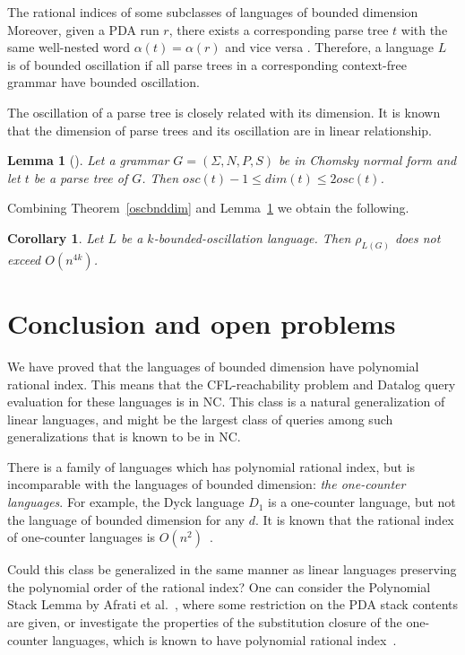 \documentclass[11pt,a4paper]{article} %
\newtheorem{lemma}{Lemma}
\newtheorem{corollary}{Corollary}
\begin{document}
\begin{subsection}{The rational indices of some subclasses of languages of bounded dimension}
Moreover, given a PDA run $r$, there exists a corresponding parse tree $t$ with the same well-nested word $\alpha(t)=\alpha(r)$ and vice versa \cite{BoundOsc}. Therefore, a language $L$ is of bounded oscillation if all parse trees in a corresponding context-free grammar have bounded oscillation.


The oscillation of a parse tree is closely related with its dimension. 
It is known that the dimension of parse trees and its oscillation are in linear relationship.

\begin{lemma}[\cite{BoundOsc}]
\label{boscdim}
Let a grammar $G = (\Sigma, N, P, S)$ be in Chomsky normal form and let $t$ be a parse tree of $G$. Then $osc(t) - 1 \le dim(t) \le 2osc(t)$.
\end{lemma}
Combining Theorem~\ref{oscbnddim} and Lemma~\ref{boscdim} we obtain the following.
\begin{corollary}
Let $L$ be a $k$-bounded-oscillation language. Then $\rho_{L(G)}$ does not exceed $O(n^{4k})$.
\end{corollary}



\end{subsection}

\section{Conclusion and open problems}
\label{sec:conc}

We have proved that the languages of bounded dimension have polynomial rational index.
This means that the CFL-reachability problem and Datalog query evaluation for these languages is in NC.
This class is a natural generalization of linear languages, and might be the largest class of queries among such generalizations that is known to be in NC.


There is a family of languages which has polynomial rational index,
but is incomparable with the languages of bounded dimension:
\emph{the one-counter languages}. For example, the Dyck language $D_1$ is a one-counter language,
but not the language of bounded dimension for any $d$. It is known that the rational index of one-counter languages is $O(n^2)$~\cite{10.1007/978-3-662-49630-5_27}.

Could this class be generalized in the same manner as linear languages
preserving the polynomial order of the rational index?
One can consider the Polynomial Stack Lemma by Afrati et al.~\cite{ChainQ},
where some restriction on the PDA stack contents are given,
or investigate the properties of the substitution closure of the one-counter languages,
which is known to have polynomial rational index~\cite{RatBasic}. 
\end{document}
